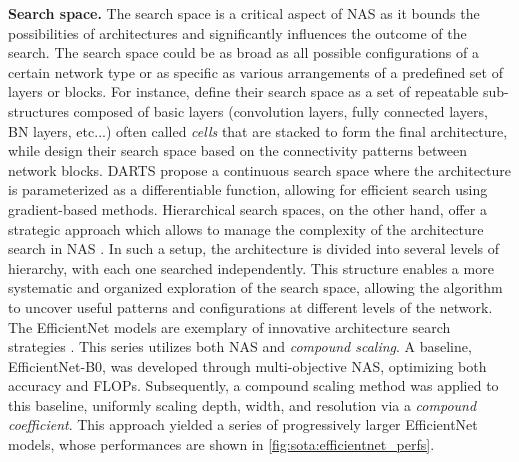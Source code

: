 \noindent\textbf{Search space.} The search space is a critical aspect of
\ac{NAS} as it bounds the possibilities of architectures and significantly
influences the outcome of the search. The search space could be as broad as all
possible configurations of a certain network type or as specific as various
arrangements of a predefined set of layers or blocks. For instance,
\cite{DBLP:conf/iclr/ZophL17} define their search space as a set of repeatable
sub-structures composed of basic layers (convolution layers, fully connected
layers, \ac{BN} layers, etc...) often called \emph{cells} that are stacked to
form the final architecture, while \cite{DBLP:conf/iclr/XieZLL19} design their
search space based on the connectivity patterns between network blocks. DARTS
\cite{DBLP:conf/iclr/LiuSY19} propose a continuous search space where the
architecture is parameterized as a differentiable function, allowing for
efficient search using gradient-based methods. Hierarchical search spaces, on
the other hand, offer a strategic approach which allows to manage the complexity
of the architecture search in \ac{NAS}
\cite{DBLP:conf/cvpr/LiuCSAHY019,DBLP:conf/cvpr/TanCPVSHL19}. In such a setup,
the architecture is divided into several levels of hierarchy, with each one
searched independently. This structure enables a more systematic and organized
exploration of the search space, allowing the algorithm to uncover useful
patterns and configurations at different levels of the network. The EfficientNet
models are exemplary of innovative architecture search strategies
\cite{DBLP:conf/icml/TanL19}. This series utilizes both \ac{NAS} and
\emph{compound scaling}. A baseline, EfficientNet-B0, was developed through
multi-objective \ac{NAS}, optimizing both accuracy and \acp{FLOP}. Subsequently,
a compound scaling method was applied to this baseline, uniformly scaling depth,
width, and resolution via a \emph{compound coefficient}. This approach yielded a
series of progressively larger EfficientNet models, whose performances are shown
in \ref{fig:sota:efficientnet_perfs}.\\\


